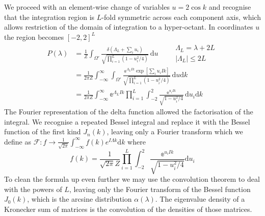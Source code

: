 We proceed with an element-wise change of variables $u=2\cos k$ and recognise that the integration region is $L$-fold symmetric across each component axis, which allows restriction of the domain of integration to a hyper-octant. In coordinates $u$ the region becomes $[-2,2]^L$
\begin{align*}
  P(\lambda)&=\frac{1}{Z}
  \int_{\Omega'}\!
  \frac{\delta(\Lambda_L+\sum_{i}u_i)}
  {\sqrt{\prod_{i=1}^L(1-u_i^2/4) }}
  \,\mathrm{d}u
  \qquad
  \begin{matrix}
    \Lambda_L=\lambda+2L \\
    |\Lambda_L|\leq2L
  \end{matrix}\\
  &=\frac{1}{2\pi Z}
  \int_{-\infty}^{\infty}\int_{\Omega'}\!
  \frac{\mathbb{e}^{\Lambda_L Ik}\exp[\sum_{i}u_i Ik]}
  {\sqrt{\prod_{i=1}^L(1-u_i^2/4) }}
  \,\mathrm{d}u\mathrm{d}k\\
  &=\frac{1}{2\pi Z}
  \int_{-\infty}^{\infty}\mathbb{e}^{\Lambda_L Ik}
  \prod_{i=1}^L\int_{-2}^{2}\!
  \frac{\mathbb{e}^{u_i Ik}}
  {\sqrt{1-u_i^2/4}}
  \,\mathrm{d}u_i\mathrm{d}k
\end{align*}
The Fourier representation of the delta function allowed the
factorisation of the integral. We recognise a repeated Bessel integral and replace it with the Bessel function of the first kind $J_n(k)$, leaving only a Fourier transform which we define as $\mathcal{F} : f\rightarrow \frac{1}{\sqrt{2\pi}} \int_{-\infty}^{\infty}f(k)e^{ I\Lambda k}\mathrm{d}k$
where
\begin{equation*}
    f(k) = \frac{1}{\sqrt{2\pi}Z}\prod_{i=1}^L\int_{-2}^{2}\!
  \frac{\mathbb{e}^{u_i Ik}}
  {\sqrt{1-u_i^2/4}} \mathrm{d}u_i
\end{equation*}
To clean the formula up even further we may use the convolution theorem to deal with the powers of $L$, leaving only the Fourier transform of the Bessel function $J_0(k)$, which is the arcsine distribution $\alpha(\lambda)$. The eigenvalue density of a Kronecker sum of matrices is the convolution of the densities of those matrices.

